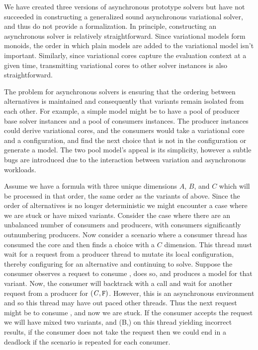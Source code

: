 We have created three versions of asynchronous prototype solvers but have not
succeeded in constructing a generalized sound asynchronous variational solver,
and thus do not provide a formalization. In principle, constructing an
asynchronous solver is relatively straightforward. Since variational models form
monoids, the order in which plain models are added to the variational model
isn't important. Similarly, since variational cores capture the evaluation
context at a given time, transmitting variational cores to other solver
instances is also straightforward.

The problem for asynchronous solvers is ensuring that the ordering between
alternatives is maintained and consequently that variants remain isolated from
each other. For example, a simple model might be to have a pool of producer base
solver instances and a pool of consumers instances. The producer instances could
derive variational cores, and the consumers would take a variational core and a
configuration, and find the next choice that is not in the configuration or
generate a model. The two pool model's appeal is its simplicity, however a
subtle bugs are introduced due to the interaction between variation and
asynchronous workloads.

Assume we have a formula with three unique dimensions $A$, $B$, and $C$ which
will be processed in that order, \ie{} the same order as the variants of \fV{}
above. Since the order of alternatives is no longer deterministic we might
encounter a case where we are stuck or have mixed variants. Consider the case
where there are an unbalanced number of consumers and producers, with consumers
significantly outnumbering producers. Now consider a scenario where a consumer
thread has consumed the  core and then finds a
choice with a $C$ dimension. This thread must wait for a request from a producer
thread to mutate its local configuration, thereby configuring for an alternative
and continuing to solve. Suppose the consumer observes a request to consume
, does so, and produces a model for that variant. Now, the
consumer will backtrack with a  call and wait for another request from a
producer for $\mathit{(C, \texttt{F}{})}$. However, this is an asynchronous environment
and so this thread may have out paced other threads. Thus the next request might
be to consume , and now we are stuck. If the consumer accepts
the request we will have mixed two variants,  and \set(B,\tru{})
on this thread yielding incorrect results, if the consumer does not take the
request then we could end in a deadlock if the scenario is repeated for each
consumer.

